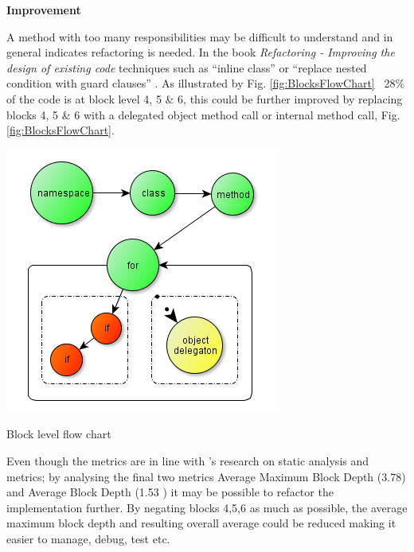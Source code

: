 		\begin{multicols}{2}
			
			\large{\bfseries{Improvement}}
			\vspace{2mm}
		
			\normalsize
			{
				A method with too many responsibilities may be difficult to understand and in general indicates refactoring is needed.
				In the book \textit{Refactoring - Improving the design of existing code} techniques such as ``inline class'' or ``replace nested condition with guard clauses'' 
				\citet{FowlerRefactoring}.
				\newline				
				\newline
				As illustrated by Fig. \ref{fig:BlocksFlowChart} ~28\% of the 
				code is at block level 4, 5 \& 6, this could be further improved by replacing blocks 4, 5 \& 6 with a
				delegated object method call or internal method call, Fig. \ref{fig:BlocksFlowChart}.  
			}	

			\columnbreak			

			\begin{figurehere}
				\centering
				\includegraphics[scale=0.6]{pages/chapter4/figures/blocks.png}
				\vspace{-2mm}
				\caption{Block level flow chart}
				\label{fig:BlocksFlowChart}
			\end{figurehere}
		
		\end{multicols}
		
		\normalsize
		{
			Even though the metrics are in line with \citet{Gintenreiter}'s
			research on static analysis and metrics; by analysing the final two metrics Average Maximum Block Depth (3.78) and
			Average Block Depth (1.53 ) it may be possible to refactor the implementation further.
			By negating blocks 4,5,6 as much as possible, the average maximum block depth and resulting overall average could be reduced making it easier
			to manage, debug, test etc.
			\newline
		}	
				

